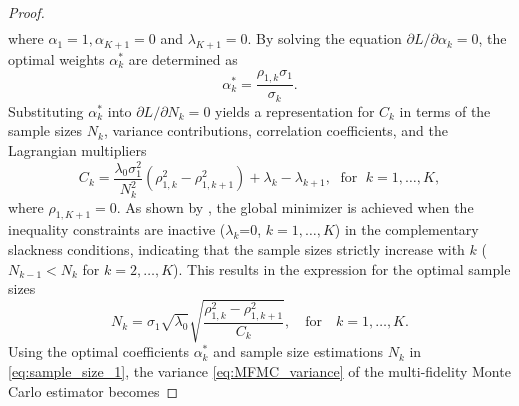 \begin{proof}
\begin{align*}
\end{align*}
%
where $\alpha_1 = 1, \alpha_{K+1} = 0$ and $\lambda_{K+1} = 0$. By solving the equation $\partial L/\partial \alpha_k=0$, the optimal weights $\alpha_k^*$ are determined as
%
\[
\alpha_k^*=\frac{\rho_{1,k}\sigma_1}{\sigma_k}.
\]
%
Substituting $\alpha_k^*$ into $\partial L/\partial N_k=0$ yields a representation for $C_k$ in terms of the sample sizes $N_k$, variance contributions, correlation coefficients, and the Lagrangian multipliers
\begin{equation*}
    C_k=\frac{\lambda_0\sigma_1^2}{N_k^2}\left(\rho_{1,k}^2-\rho_{1,k+1}^2\right)+\lambda_k-\lambda_{k+1}, \;\text{ for }\; k=1,\ldots,K, 
\end{equation*}
where $\rho_{1,K+1} = 0$. As shown by  \cite{PeWiGu:2016}, the global minimizer is achieved when the inequality constraints are inactive ($\lambda_k$=0, $k=1,\dots, K$) in the complementary slackness conditions, indicating that the sample sizes strictly increase with $k$ ($N_{k-1}< N_k$ for $k=2,\ldots, K$). This results in the expression for the optimal sample sizes
\begin{equation}
\label{eq:sample_size_1}
    N_k = \sigma_1\sqrt{\lambda_0}\sqrt{\frac{\rho_{1,k}^2-\rho_{1,k+1}^2}{C_k}},\quad \text{for}\quad  k=1,\ldots,K.
\end{equation}
Using the optimal coefficients $\alpha_k^*$ and sample size estimations $N_k$ in \eqref{eq:sample_size_1}, the variance \eqref{eq:MFMC_variance} of the multi-fidelity Monte Carlo estimator becomes

\end{proof}
